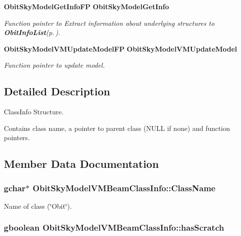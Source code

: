 \begin{CompactItemize}
{\bf Obit\-Sky\-Model\-Get\-Info\-FP} {\bf Obit\-Sky\-Model\-Get\-Info}
\begin{CompactList}\small\item\em Function pointer to Extract information about underlying structures to {\bf Obit\-Info\-List}{\rm (p.\,\pageref{structObitInfoList})}. \item\end{CompactList}\item 
{\bf Obit\-Sky\-Model\-VMUpdate\-Model\-FP} {\bf Obit\-Sky\-Model\-VMUpdate\-Model}
\begin{CompactList}\small\item\em Function pointer to update model. \item\end{CompactList}\end{CompactItemize}


\subsection{Detailed Description}
Class\-Info Structure. 

Contains class name, a pointer to parent class (NULL if none) and function pointers. 



\subsection{Member Data Documentation}
\subsubsection{\setlength{\rightskip}{0pt plus 5cm}gchar$\ast$ {\bf Obit\-Sky\-Model\-VMBeam\-Class\-Info::Class\-Name}}\label{structObitSkyModelVMBeamClassInfo_o2}


Name of class (\char`\"{}Obit\char`\"{}). 

\subsubsection{\setlength{\rightskip}{0pt plus 5cm}gboolean {\bf Obit\-Sky\-Model\-VMBeam\-Class\-Info::has\-Scratch}}\label{structObitSkyModelVMBeamClassInfo_o1}


